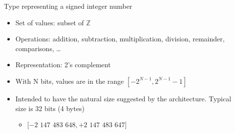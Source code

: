 \begin{frame}[fragile]{}

  \begin{columns}
    \begin{column}{.8\textwidth}
      Type representing a signed integer number

      \begin{itemize}
      \item<2-> Set of values: subset of $\mathbb{Z}$
      \item<3-> Operations: addition, subtraction, multiplication, division,
        remainder, comparisons, \ldots
      \item<4-> Representation: 2's complement
      \item<5-> With N bits, values are in the range $[-2^{N-1}, 2^{N-1}-1]$
      \item<6-> Intended to have the natural size suggested by the architecture.
        Typical size is 32 bits (4 bytes)
        \begin{itemize}
        \item $[-2$ $147$ $483$ $648, +2$ $147$ $483$ $647]$
        \end{itemize}
      \end{itemize}
    \end{column}
    \hfill
    \begin{column}{.2\textwidth}
    \end{column}
  \end{columns}

\end{frame}

